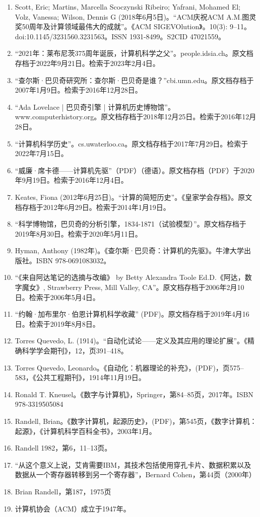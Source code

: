 \begin{enumerate}
\item Scott, Eric; Martins, Marcella Scoczynski Ribeiro; Yafrani, Mohamed El; Volz, Vanessa; Wilson, Dennis G (2018年6月5日)。“ACM庆祝ACM A.M.图灵奖50周年及计算领域最伟大的成就”。《ACM SIGEVOlution》。10(3): 9–11。doi:10.1145/3231560.3231563。ISSN 1931-8499。S2CID 47021559。  
\item “2021年：莱布尼茨375周年诞辰，计算机科学之父”。people.idsia.ch。原文档存档于2022年9月21日。检索于2023年2月4日。  
\item “查尔斯·巴贝奇研究所：查尔斯·巴贝奇是谁？”cbi.umn.edu。原文档存档于2007年1月9日。检索于2016年12月28日。  
\item “Ada Lovelace | 巴贝奇引擎 | 计算机历史博物馆”。www.computerhistory.org。原文档存档于2018年12月25日。检索于2016年12月28日。  
\item “计算机科学历史”。cs.uwaterloo.ca。原文档存档于2017年7月29日。检索于2022年7月15日。  
\item “威廉·席卡德——计算机先驱”（PDF）（德语）。原文档存档（PDF）于2020年9月19日。检索于2016年12月4日。  
\item Keates, Fiona (2012年6月25日)。“计算的简短历史”。《皇家学会存档》。原文档存档于2012年6月29日。检索于2014年1月19日。  
\item “科学博物馆，巴贝奇的分析引擎，1834-1871（试验模型）”。原文档存档于2019年8月30日。检索于2020年5月11日。  
\item Hyman, Anthony (1982年)。《查尔斯·巴贝奇：计算机的先驱》。牛津大学出版社。ISBN 978-0691083032。

\item “《来自阿达笔记的选摘与改编》 by Betty Alexandra Toole Ed.D.《阿达，数字魔女》, Strawberry Press, Mill Valley, CA”。原文档存档于2006年2月10日。检索于2006年5月4日。  
\item “约翰·加布里尔·伯恩计算机科学收藏” (PDF)。原文档存档于2019年4月16日。检索于2019年8月8日。  
\item Torres Quevedo, L. (1914)。“自动化试论——定义及其应用的理论扩展”。《精确科学学会期刊》，12，页391–418。  
\item Torres Quevedo, Leonardo。《自动化：机器理论的补充》，(PDF)，页575–583，《公共工程期刊》，1914年11月19日。  
\item Ronald T. Kneusel。《数字与计算机》，Springer，第84–85页，2017年。ISBN 978-3319505084  
\item Randell, Brian。《数字计算机，起源历史》，(PDF)，第545页，《数字计算机：起源》，《计算机科学百科全书》，2003年1月。  
\item Randell 1982，第6，11–13页。  
\item “从这个意义上说，艾肯需要IBM，其技术包括使用穿孔卡片、数据积累以及数据从一个寄存器转移到另一个寄存器”，Bernard Cohen，第44页（2000年）  
\item Brian Randell，第187，1975页  
\item 计算机协会（ACM）成立于1947年。


\end{enumerate}
